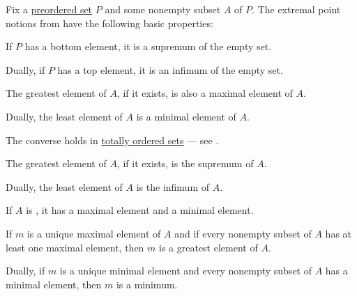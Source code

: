 \begin{proposition}\label{thm:def:extremal_points}
  Fix a \hyperref[def:preordered_set]{preordered set} \( P \) and some nonempty subset \( A \) of \( P \). The extremal point notions from  have the following basic properties:
  \begin{thmenum}
     If \( P \) has a bottom element, it is a supremum of the empty set.

    Dually, if \( P \) has a top element, it is an infimum of the empty set.

     The greatest element of \( A \), if it exists, is also a maximal element of \( A \).

    Dually, the least element of \( A \) is a minimal element of \( A \).

    The converse holds in \hyperref[def:totally_ordered_set]{totally ordered sets} --- see .

     The greatest element of \( A \), if it exists, is the supremum of \( A \).

    Dually, the least element of \( A \) is the infimum of \( A \).

     If \( A \) is , it has a maximal element and a minimal element.

     If \( m \) is a unique maximal element of \( A \) and if every nonempty subset of \( A \) has at least one maximal element, then \( m \) is a greatest element of \( A \).

    Dually, if \( m \) is a unique minimal element and every nonempty subset of \( A \) has a minimal element, then \( m \) is a minimum.
  \end{thmenum}
\end{proposition}
